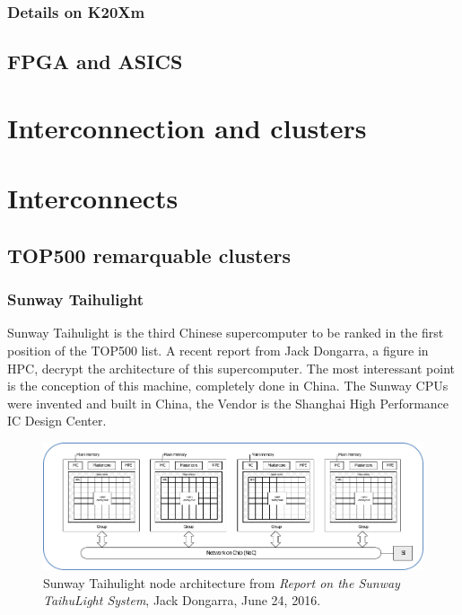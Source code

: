 \subsubsection{Details on K20Xm}


\subsection{FPGA and ASICS}

\section{Interconnection and clusters}

\section{Interconnects}


\subsection{TOP500 remarquable clusters}
\subsubsection{Sunway Taihulight}

Sunway Taihulight is the third Chinese supercomputer to be ranked in the first position of the TOP500 list. 
A recent report from Jack Dongarra, a figure in HPC, decrypt the architecture of this supercomputer\cite{dongarra2016report}. 
The most interessant point is the conception of this machine, completely done in China. 
The Sunway CPUs were invented and built in China, the Vendor is the Shanghai High Performance IC Design Center. 

\begin{figure}
\centering
\includegraphics[scale=1]{figures/Chap1/report_sunway_CPE}
\caption{Sunway Taihulight node architecture from \textit{Report on the Sunway TaihuLight System}, Jack Dongarra, June 24, 2016.}
\label{fig:chap1_report_sunway_CPE}
\end{figure}

